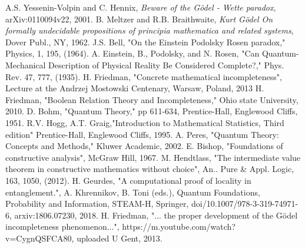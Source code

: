 \documentclass{appolb}
\begin{document}
\begin{thebibliography}{10}
 A.S. Yessenin-Volpin and C. Hennix, \emph{Beware of the G{\"o}del - Wette paradox}, arXiv:0110094v22, 2001.
 B. Meltzer and R.B. Braithwaite, \emph{Kurt G{\"o}del On formally undecidable propositions of principia mathematica and related systems}, Dover Publ., NY, 1962.
 J.S. Bell, "On the Einstein Podolsky Rosen paradox," Physics, 1, 195, (1964).
 A. Einstein, B., Podolsky, and N. Rosen, "Can Quantum-Mechanical Description of Physical Reality Be Considered Complete?," Phys. Rev. 47, 777, (1935).
H. Friedman, "Concrete mathematical incompleteness", Lecture at the Andrzej Mostowski Centenary, Warsaw, Poland, 2013
 H. Friedman, "Boolean Relation Theory and Incompleteness," Ohio state University, 2010.
 D. Bohm, "Quantum Theory," pp 611-634, Prentice-Hall, Englewood Cliffs, 1951.
 R.V. Hogg, A.T. Graig,"Introduction to Mathematical Statistics, Third edition" Prentice-Hall, Englewood Cliffs, 1995.
 A. Peres, "Quantum Theory: Concepts and Methods," Kluwer Academic, 2002.
 E. Bishop, "Foundations of constructive analysis", McGraw Hill, 1967. 
 M. Hendtlass, "The intermediate value theorem in constructive mathematics without choice", An.. Pure \& Appl. Logic, 163, 1050, (2012).
 H. Geurdes, "A computational proof of locality in entanglement.", A. Khrennikov, B. Toni (eds.), Quantum Foundations, Probability and Information, STEAM-H, Springer, doi/10.1007/978-3-319-74971-6, arxiv:1806.07230, 2018.
 H. Friedman, "... the proper development of the G{\"o}del incompleteness phenomenon...",  https://m.youtube.com/watch?v=CygnQSFCA80, uploaded U Gent, 2013.
\end{thebibliography}
\newpage
\end{document}
